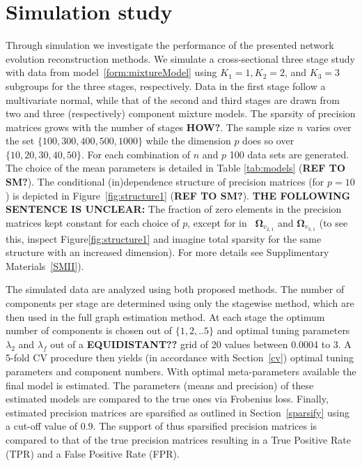 \documentclass[10pt]{article}
\begin{document}
\section{Simulation study}
Through simulation we investigate the performance of the presented 
network evolution reconstruction methods. We simulate a cross-sectional three stage study with data from model~\eqref{form:mixtureModel} using $K_1=1, K_2=2$, and $K_3=3$ subgroups for the three stages, respectively. Data in the first stage follow a multivariate normal, while that of the second and third stages are drawn from two and three (respectively) component mixture models. The sparsity of precision matrices grows with the number of stages \textbf{HOW?}. The sample size $n$ varies over the set $\{ 100, 300,400, 500, 1000 \}$ while the dimension $p$ does so over $\{10,20,30,40,50\}$. For each combination of $n$ and $p$ 100 data sets are generated. The choice of the mean parameters is detailed in Table \ref{tab:models} (\textbf{REF TO SM?}). The conditional (in)dependence structure of precision matrices (for $p=10$) is depicted in Figure~\ref{fig:structure1} (\textbf{REF TO SM?}). \textbf{THE FOLLOWING SENTENCE IS UNCLEAR:} The fraction of zero elements in the precision matrices kept constant for each choice of $p$, except for in ~$\mathbf{\Omega}_{v_{2,1}}$ and $\mathbf{\Omega}_{v_{3,1}}$ (to see this, inspect Figure\ref{fig:structure1} and imagine total sparsity for the same structure with an increased dimension). For more details see Supplimentary Materials~\ref{SMII}).

The simulated data are analyzed using both proposed methods. The number of components per stage are determined using only the stagewise method, which are then used in the full graph estimation method. At each stage the optimum number of components is chosen out of $\{1,2,..5\}$ and optimal tuning parameters $\lambda_2$ and $\lambda_f$ out of a \textbf{EQUIDISTANT??} grid of 20 values between 0.0004 to 3. A 5-fold CV procedure then yields (in accordance with Section~\ref{cv}) optimal tuning parameters and component numbers. With optimal meta-parameters available the final model is estimated. The parameters (means and precision) of these estimated models are compared to the true ones via Frobenius loss. Finally, estimated precision matrices are sparsified as outlined in Section~\ref{sparsify} using a cut-off value of $0.9$. The support of thus sparsified precision matrices is compared to that of the true precision matrices resulting in a True Positive Rate (TPR) and a False Positive Rate (FPR).
\end{document}
